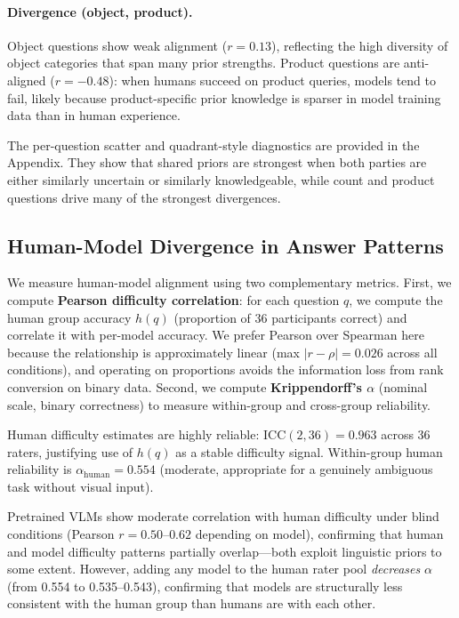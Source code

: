\documentclass[letterpaper]{article}
\begin{document}
\paragraph{Divergence (object, product).}
Object questions show weak alignment ($r = 0.13$), reflecting the
high diversity of object categories that span many prior strengths.
Product questions are anti-aligned ($r = -0.48$): when humans succeed
on product queries, models tend to fail, likely because product-specific
prior knowledge is sparser in model training data than in human experience.

The per-question scatter and quadrant-style diagnostics are provided in the
Appendix. They show that shared priors are strongest when both parties are
either similarly uncertain or similarly knowledgeable, while count and product
questions drive many of the strongest divergences.

\subsection{Human-Model Divergence in Answer Patterns}

We measure human-model alignment using two complementary metrics.
First, we compute \textbf{Pearson difficulty correlation}: for each question
$q$, we compute the human group accuracy $h(q)$ (proportion of 36 participants
correct) and correlate it with per-model accuracy.
We prefer Pearson over Spearman here because the relationship is approximately
linear (max $|r - \rho| = 0.026$ across all conditions), and operating on
proportions avoids the information loss from rank conversion on binary data.
Second, we compute \textbf{Krippendorff's $\alpha$} (nominal scale, binary
correctness) to measure within-group and cross-group reliability.

Human difficulty estimates are highly reliable: $\text{ICC}(2,36) = 0.963$
across 36 raters, justifying use of $h(q)$ as a stable difficulty signal.
Within-group human reliability is $\alpha_{\text{human}} = 0.554$ (moderate,
appropriate for a genuinely ambiguous task without visual input).

Pretrained VLMs show moderate correlation with human difficulty under blind
conditions (Pearson $r = 0.50$--$0.62$ depending on model), confirming that
human and model difficulty patterns partially overlap---both exploit linguistic
priors to some extent. However, adding any model to the human rater pool
\emph{decreases} $\alpha$ (from 0.554 to 0.535--0.543), confirming that models
are structurally less consistent with the human group than humans are with each
other.
\end{document}
